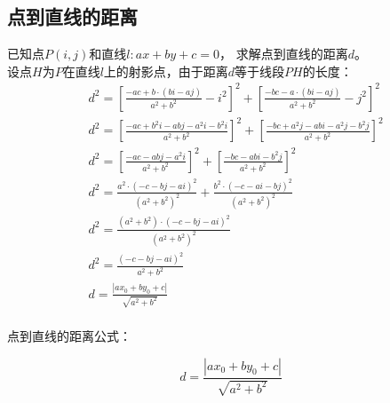 \documentclass[UTF8]{ctexart}
\begin{document}
\subsection{点到直线的距离}
    已知点$P(i,j)$和直线$l:ax+by+c=0$，
    求解点到直线的距离$d$。\\[3mm]
    设点$H$为$P$在直线$l$上的射影点，由于距离$d$等于线段$PH$的长度：\vspace{15pt}
    \setcounter{equation}{0}
    \begin{align}
        &d^2=\left[\frac{-ac+b\cdot(bi-aj)}{a^2+b^2}-i^2\right]^2+\left[\frac{-bc-a\cdot(bi-aj)}{a^2+b^2}-j^2\right]^2\\[7mm]
        &d^2=\left[\frac{-ac+b^2i-abj-a^2i-b^2i}{a^2+b^2}\right]^2+\left[\frac{-bc+a^2j-abi-a^2j-b^2j}{a^2+b^2}\right]^2\\[7mm]
        &d^2=\left[\frac{-ac-abj-a^2i}{a^2+b^2}\right]^2+\left[\frac{-bc-abi-b^2j}{a^2+b^2}\right]^2\\[7mm]
        &d^2=\frac{a^2\cdot\left(-c-bj-ai\right)^2}{\left(a^2+b^2\right)^2}+\frac{b^2\cdot\left(-c-ai-bj\right)^2}{\left(a^2+b^2\right)^2}\\[7mm]
        &d^2=\frac{(a^2+b^2)\cdot\left(-c-bj-ai\right)^2}{\left(a^2+b^2\right)^2}\\[7mm]
        &d^2=\frac{\left(-c-bj-ai\right)^2}{a^2+b^2}\\[8mm]
        &d=\frac{\left|ax_{0}+by_{0}+c\right|}{\sqrt{{a}^{2}+{b}^{2}}}
    \end{align}\\[1mm]
    点到直线的距离公式：
    \begin{large}
        \begin{equation*}
            d=\frac{\left|ax_{0}+by_{0}+c\right|}{\sqrt{{a}^{2}+{b}^{2}}}
        \end{equation*}
    \end{large}\\

\newpage
\end{document}
